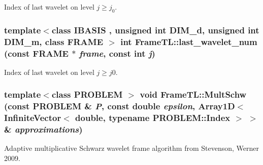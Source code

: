Index of last wavelet on level $j \geq j_0$. \hypertarget{namespaceFrameTL_98345f161b05ac9604fbd9070da0bba7}{
\subsubsection[{last\_\-wavelet\_\-num}]{\setlength{\rightskip}{0pt plus 5cm}template$<$class IBASIS , unsigned int DIM\_\-d, unsigned int DIM\_\-m, class FRAME $>$ int FrameTL::last\_\-wavelet\_\-num (const FRAME $\ast$ {\em frame}, \/  const int {\em j})}}
\label{namespaceFrameTL_98345f161b05ac9604fbd9070da0bba7}


Index of last wavelet on level $j \geq j0$. \hypertarget{namespaceFrameTL_a6fc7f7f5f218c3dc3e34081b4e7464d}{
\subsubsection[{MultSchw}]{\setlength{\rightskip}{0pt plus 5cm}template$<$class PROBLEM $>$ void FrameTL::MultSchw (const PROBLEM \& {\em P}, \/  const double {\em epsilon}, \/  Array1D$<$ InfiniteVector$<$ double, typename PROBLEM::Index $>$ $>$ \& {\em approximations})}}
\label{namespaceFrameTL_a6fc7f7f5f218c3dc3e34081b4e7464d}


Adaptive multiplicative Schwarz wavelet frame algorithm from Stevenson, Werner 2009. 


